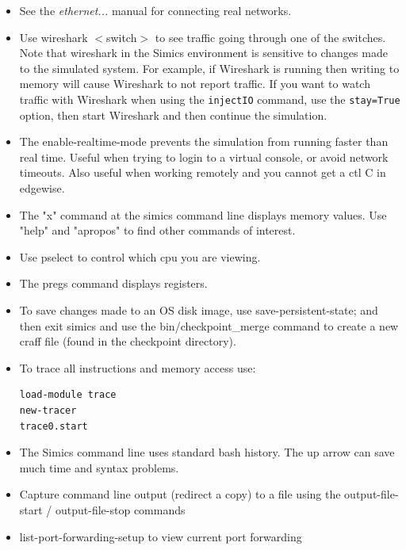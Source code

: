 \documentclass[titlepage]{article}
\begin{document}
\begin{appendices}
\begin{itemize}
\item See the \textit{ethernet...} manual for connecting real networks.

\item Use wireshark $<$switch$>$ to see traffic going through one of the switches. Note that wireshark in the Simics environment is sensitive to 
changes made to the simulated system.  For example, if Wireshark is running then writing to memory will cause Wireshark to not report traffic.  
If you want to watch traffic with Wireshark when using the {\tt injectIO} command, use the {\tt stay=True} option, then start Wireshark and then
continue the simulation.

\item The enable-realtime-mode prevents the simulation from running faster than real time.  Useful when trying to login
to a virtual console, or avoid network timeouts.  Also useful when working remotely and you cannot get a ctl C in 
edgewise.

\item The "x" command at the simics command line displays memory values.  Use "help" and "apropos" to find other commands of interest.

\item Use pselect to control which cpu you are viewing.

\item The pregs command displays registers.  

\item To save changes made to an OS disk image, use save-persistent-state; and then exit simics and use the bin/checkpoint\_merge command
to create a new craff file (found in the checkpoint directory).

\item To trace all instructions and memory access use:
\begin{verbatim}
load-module trace
new-tracer
trace0.start
\end{verbatim}

\item The Simics command line uses standard bash history.  The up arrow can save much time and syntax problems.

\item Capture command line output (redirect a copy) to a file using the output-file-start / output-file-stop commands

\item {list-port-forwarding-setup} to view current port forwarding
\end{itemize}


\end{appendices}
\end{document}
